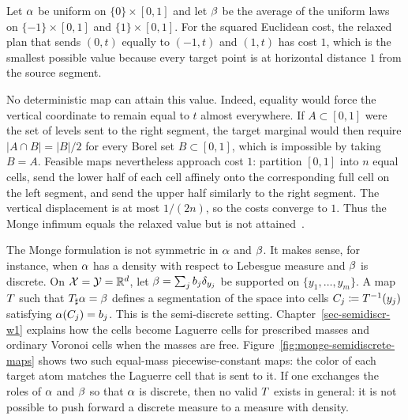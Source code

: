 \begin{example}\label{ex-splitting-obstruction}
	Let $\alpha$ be uniform on $\{0\}\times[0,1]$ and let $\beta$ be the average of the uniform laws on $\{-1\}\times[0,1]$ and $\{1\}\times[0,1]$. For the squared Euclidean cost, the relaxed plan that sends $(0,t)$ equally to $(-1,t)$ and $(1,t)$ has cost $1$, which is the smallest possible value because every target point is at horizontal distance $1$ from the source segment.

	No deterministic map can attain this value. Indeed, equality would force the vertical coordinate to remain equal to $t$ almost everywhere. If $A\subset[0,1]$ were the set of levels sent to the right segment, the target marginal would then require
	$|A\cap B|=|B|/2$ for every Borel set $B\subset[0,1]$, which is impossible by taking $B=A$. Feasible maps nevertheless approach cost $1$: partition $[0,1]$ into $n$ equal cells, send the lower half of each cell affinely onto the corresponding full cell on the left segment, and send the upper half similarly to the right segment. The vertical displacement is at most $1/(2n)$, so the costs converge to $1$. Thus the Monge infimum equals the relaxed value but is not attained~\cite{SantambrogioBook}.
\end{example}

\begin{example}
	The Monge formulation is not symmetric in $\alpha$ and $\beta$. It makes sense, for instance, when $\alpha$ has a density with respect to Lebesgue measure and $\beta$ is discrete. On $\mathcal{X}=\mathcal{Y}=\mathbb{R}^d$, let $\beta=\sum_j b_j\delta_{y_j}$ be supported on $\{y_1,\ldots,y_m\}$. A map $T$ such that $T_\sharp\alpha=\beta$ defines a segmentation of the space into cells
	$C_j\coloneqq T^{-1}(y_j)$ satisfying $\alpha(C_j)=b_j$.
	This is the semi-discrete setting. Chapter~\ref{sec-semidiscr-w1} explains how the cells become Laguerre cells for prescribed masses and ordinary Voronoi cells when the masses are free. Figure~\ref{fig:monge-semidiscrete-maps} shows two such equal-mass piecewise-constant maps: the color of each target atom matches the Laguerre cell that is sent to it. If one exchanges the roles of $\alpha$ and $\beta$ so that $\alpha$ is discrete, then no valid $T$ exists in general: it is not possible to push forward a discrete measure to a measure with density.
\end{example}

